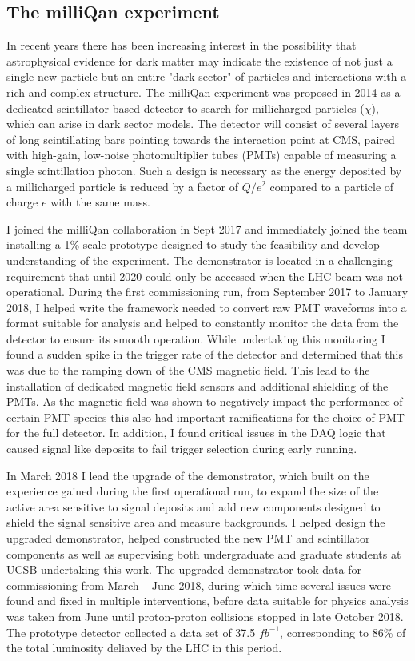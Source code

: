 \documentclass[11pt]{article}
\theoremstyle{plain} \numberwithin{equation}{section}
\theoremstyle{definition}
\begin{document}
\subsection*{The milliQan experiment}

In recent years there has been increasing interest in the possibility 
that astrophysical evidence for dark matter may indicate the existence 
of not just a single new particle but an entire "dark sector"
of particles and interactions with a rich and complex structure. The milliQan experiment 
was proposed in 2014 as a dedicated scintillator-based detector to search 
for millicharged particles ($\chi$), which can arise in dark sector models. 
The detector will consist of several layers of long scintillating bars pointing towards 
the interaction point at CMS, paired with high-gain, low-noise photomultiplier tubes (PMTs) 
capable of measuring a single scintillation photon. Such a design is necessary as the 
energy deposited by a millicharged particle 
is reduced by a factor of $Q/e^2$ compared to a particle of charge
$e$ with the same mass.

I joined the milliQan collaboration in Sept 2017 and immediately joined the
team installing a 1\% scale prototype designed to study the feasibility and
develop understanding of the experiment. The demonstrator is located in 
a challenging requirement that until 2020 could only be accessed when the LHC 
beam was not operational. During the first commissioning run, 
from September 2017 to January 2018, 
I helped write the framework needed to convert raw PMT waveforms into 
a format suitable for analysis and helped to constantly monitor
the data from the detector to ensure its smooth operation. While undertaking this 
monitoring I found a sudden spike in the trigger rate of the detector and determined
that this was due to the ramping down of the CMS magnetic field. This lead to the installation
of dedicated magnetic field sensors and additional shielding of the PMTs. As the magnetic field
was shown to negatively impact the performance of certain PMT species this also had
important ramifications for the choice of PMT for the full detector. In addition, I
found critical issues in the DAQ logic that caused signal like deposits to fail
trigger selection during early running.

In March 2018 I lead the upgrade of the demonstrator, which built on the experience 
gained during the first operational run, to expand the size of the active area
sensitive to signal deposits and add new components designed to shield the signal
sensitive area and measure backgrounds. I helped design the upgraded demonstrator,
helped constructed the new PMT and scintillator components as well as 
supervising both undergraduate and graduate students at UCSB undertaking this work.
The upgraded demonstrator took data for commissioning from March -- June 2018, during which 
time several issues were found and fixed in multiple interventions, before data suitable for physics
analysis was taken from June until proton-proton collisions stopped in late October 2018. 
The prototype detector collected a data set of 37.5 $fb^{-1}$, corresponding to 86\% of the total luminosity 
deliaved by the LHC in this period.
\end{document}
